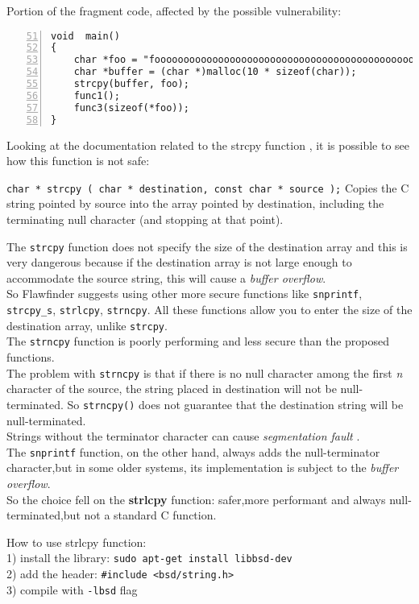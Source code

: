\documentclass[a4paper,12pt]{article}
\newenvironment{SpecialPar}
  {\begin{shaded}}
  {\end{shaded}}
\begin{document}
Portion of the fragment code, affected by the possible vulnerability:
\begin{lstlisting}[style=c,numbers=left,firstnumber=51,linebackgroundcolor={\ifnum\value{lstnumber}=55\color{red}\fi}]
void  main()
{
	char *foo = "fooooooooooooooooooooooooooooooooooooooooooooooooooo";
	char *buffer = (char *)malloc(10 * sizeof(char));
	strcpy(buffer, foo);
	func1();
	func3(sizeof(*foo));
}
\end{lstlisting}
Looking at the documentation related to the strcpy function \cite{strcpy}, it is possible to see how this function is not safe:\\
\begin{SpecialPar}
\noindent
\texttt{char * strcpy ( char * destination, const char * source );}
Copies the C string pointed by source into the array 		pointed by destination, including the terminating null character (and stopping at that point).
\end{SpecialPar}
\noindent
The \texttt{strcpy} function does not specify the size of the destination array and this is very dangerous because if the destination array is not large enough to accommodate the source string, this will cause a \textit{buffer overflow}.\\
So Flawfinder suggests using other more secure functions like \texttt{snprintf}, \texttt{strcpy\_s}, \texttt{strlcpy}, \texttt{strncpy}.
All these functions allow you to enter the size of the destination array, unlike \texttt{strcpy}.\\
The \texttt{strncpy} function is poorly performing and less secure than the proposed functions.\\
The problem with \texttt{strncpy} is that if there is no null character among the first \textit{n} character of the source, the string placed in destination will not be null-terminated. So \texttt{strncpy()} does not guarantee that the destination string will be null-terminated.\\ Strings without the terminator character can cause \textit{segmentation fault} \cite{geeksstrcpy}.\\
The \texttt{snprintf} function, on the other hand, always adds the null-terminator character,but in some older systems, its implementation is subject to the \textit{buffer overflow}.\\
So the choice fell on the \textbf{strlcpy} function: safer,more performant and always null-terminated,but not a standard C function.\\
\begin{SpecialPar}

\noindent
How to use strlcpy function:\\
 1) install the library: \texttt{sudo apt-get install libbsd-dev}\\
 2) add the header: \texttt{\#include <bsd/string.h>}\\
 3) compile with \texttt{-lbsd} flag\\
\end{SpecialPar}
\end{document}
